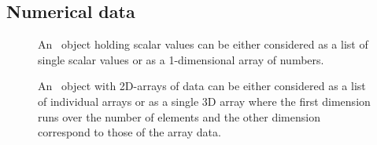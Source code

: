 \subsection{Numerical data}
\begin{figure}[tb]
\centering
\begin{minipage}[t]{0.39\linewidth}
\centering
{}
\caption{{\small\label{fig:container_scalar} An \nxfield\ object holding 
scalar values can be either considered as a list of single scalar values 
or as a 1-dimensional array of numbers.}}
\end{minipage}
\hfill
\begin{minipage}[t]{0.58\linewidth}
\centering
{}
\caption{{\small\label{fig:container_array}An \nxfield\ object with 2D-arrays 
of data can be either considered as a list of individual arrays or as a
single 3D array where the first dimension runs over the number of elements
and the other dimension correspond to those of the array data.}}
\end{minipage}
\end{figure} 
